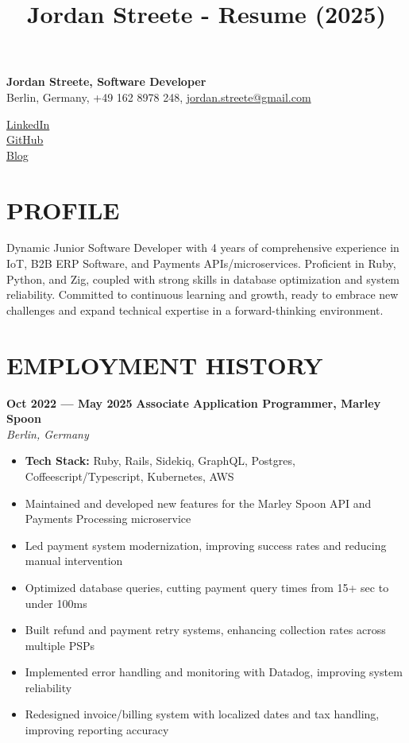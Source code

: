 \documentclass[11pt,a4paper]{article}
\title{Jordan Streete - Resume (2025)}
\newcommand{\resumesection}[1]{
  \section*{\textcolor{sectioncolor}{\MakeUppercase{#1}}}
}
\newcommand{\job}[4]{
  \textbf{#1 — #2} \hfill \textbf{#3} \\
  \textit{#4}
}
\begin{document}
\begin{minipage}[t]{0.6\textwidth}
{\LARGE\textbf{Jordan Streete, Software Developer}}\\
Berlin, Germany, +49 162 8978 248, \href{mailto:jordan.streete+work-apps-2025@gmail.com}{jordan.streete@gmail.com}
\end{minipage}
\hfill
\begin{minipage}[t]{0.35\textwidth}
\raggedleft
\href{https://www.linkedin.com/in/jordan-streete-0b8b3711a/}{LinkedIn}\\
\href{https://github.com/BoundlessCarrot}{GitHub}\\
\href{https://jstr.dev}{Blog}
\end{minipage}

\resumesection{Profile}
Dynamic Junior Software Developer with 4 years of comprehensive experience in IoT, B2B ERP Software, and Payments APIs/microservices. Proficient in Ruby, Python, and Zig, coupled with strong skills in database optimization and system reliability. Committed to continuous learning and growth, ready to embrace new challenges and expand technical expertise in a forward-thinking environment.

\resumesection{Employment \hspace{0.1em} History}

\job{Oct 2022} {May 2025} {Associate Application Programmer, Marley Spoon} {Berlin, Germany}
\begin{itemize}[leftmargin=*,label=$\bullet$,itemsep=0.3ex]
    \item \textbf{Tech Stack:} Ruby, Rails, Sidekiq, GraphQL, Postgres, Coffeescript/Typescript, Kubernetes, AWS
    \item Maintained and developed new features for the Marley Spoon API and Payments Processing microservice 
    \item Led payment system modernization, improving success rates and reducing manual intervention
    \item Optimized database queries, cutting payment query times from 15+ sec to under 100ms
    \item Built refund and payment retry systems, enhancing collection rates across multiple PSPs
    \item Implemented error handling and monitoring with Datadog, improving system reliability
    \item Redesigned invoice/billing system with localized dates and tax handling, improving reporting accuracy
\end{itemize}
  
\end{document}

